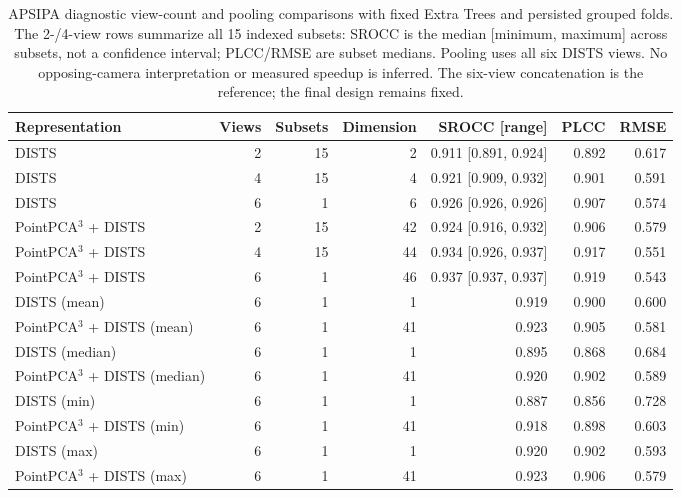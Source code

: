 \begin{table}[t!]
\centering
\caption{APSIPA diagnostic view-count and pooling comparisons with fixed Extra Trees and persisted grouped folds. The 2-/4-view rows summarize all 15 indexed subsets: SROCC is the median [minimum, maximum] across subsets, not a confidence interval; PLCC/RMSE are subset medians. Pooling uses all six DISTS views. No opposing-camera interpretation or measured speedup is inferred. The six-view concatenation is the reference; the final design remains fixed.}
\label{tab_review_views_pooling}
\scriptsize
\begin{adjustbox}{max width=\textwidth}
\begin{tabular}{lrrrrrr}
\toprule
Representation & Views & Subsets & Dimension & SROCC [range] & PLCC & RMSE \\
\midrule
DISTS & 2 & 15 & 2 & 0.911 [0.891, 0.924] & 0.892 & 0.617 \\
DISTS & 4 & 15 & 4 & 0.921 [0.909, 0.932] & 0.901 & 0.591 \\
DISTS & 6 & 1 & 6 & 0.926 [0.926, 0.926] & 0.907 & 0.574 \\
PointPCA$^3$ + DISTS & 2 & 15 & 42 & 0.924 [0.916, 0.932] & 0.906 & 0.579 \\
PointPCA$^3$ + DISTS & 4 & 15 & 44 & 0.934 [0.926, 0.937] & 0.917 & 0.551 \\
PointPCA$^3$ + DISTS & 6 & 1 & 46 & 0.937 [0.937, 0.937] & 0.919 & 0.543 \\
DISTS (mean) & 6 & 1 & 1 & 0.919 & 0.900 & 0.600 \\
PointPCA$^3$ + DISTS (mean) & 6 & 1 & 41 & 0.923 & 0.905 & 0.581 \\
DISTS (median) & 6 & 1 & 1 & 0.895 & 0.868 & 0.684 \\
PointPCA$^3$ + DISTS (median) & 6 & 1 & 41 & 0.920 & 0.902 & 0.589 \\
DISTS (min) & 6 & 1 & 1 & 0.887 & 0.856 & 0.728 \\
PointPCA$^3$ + DISTS (min) & 6 & 1 & 41 & 0.918 & 0.898 & 0.603 \\
DISTS (max) & 6 & 1 & 1 & 0.920 & 0.902 & 0.593 \\
PointPCA$^3$ + DISTS (max) & 6 & 1 & 41 & 0.923 & 0.906 & 0.579 \\
\bottomrule
\end{tabular}
\end{adjustbox}
\end{table}
